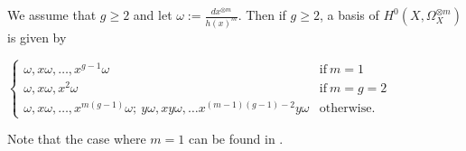 \begin{prop}
We assume that $g\geq 2$ and let $\omega:= \frac{dx^{\otimes m}}{h(x)^m}$. 
Then if $g\geq 2$, a basis of $H^0(X,\Omega_X^{\otimes m})$ is given by


$\begin{cases}
\omega, x\omega, \ldots , x^{g-1}\omega &  \mbox{if}\ m=1 \\
\omega, x\omega, x^2\omega & \mbox{if}\ m=g=2 \\
\omega, x\omega, \ldots, x^{m(g-1)}\omega;\  y\omega, xy\omega, \ldots x^{(m-1)(g-1)-2}y\omega & \mbox{otherwise.}
\end{cases}
$
\end{prop}
\begin{rem}
Note that the case where $m=1$ can be found in \cite[Prop. 7.4.26]{liu}.
\end{rem}

